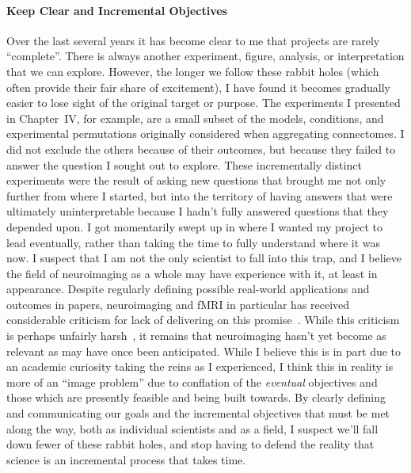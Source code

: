 \paragraph*{Keep Clear and Incremental Objectives}
Over the last several years it has become clear to me that projects are rarely ``complete''. There is always
another experiment, figure, analysis, or interpretation that we can explore. However, the longer we follow these
rabbit holes (which often provide their fair share of excitement), I have found it becomes gradually easier to lose
sight of the original target or purpose. The experiments I presented in Chapter~IV, for example, are a small
subset of the models, conditions, and experimental permutations originally considered when aggregating connectomes.
I did not exclude the others because of their outcomes, but because they failed to answer the question I sought out
to explore. These incrementally distinct experiments were the result of asking new questions that brought me not
only further from where I started, but into the territory of having answers that were ultimately uninterpretable
because I hadn't fully answered questions that they depended upon. I got momentarily swept up in where I wanted my
project to lead eventually, rather than taking the time to fully understand where it was now. I suspect that I am
not the only scientist to fall into this trap, and I believe the field of neuroimaging as a whole may have
experience with it, at least in appearance. Despite regularly defining possible real-world applications and outcomes
in papers, neuroimaging and fMRI in particular has received considerable criticism for lack of delivering on this
promise~\cite{robinson2004fmri}. While this criticism is perhaps unfairly harsh~\cite{lyon2017dead}, it remains that
neuroimaging hasn't yet become as relevant as may have once been anticipated. While I believe this is in part due to
an academic curiosity taking the reins as I experienced, I think this in reality is more of an ``image problem'' due
to conflation of the \textit{eventual} objectives and those which are presently feasible and being built towards. By
clearly defining and communicating our goals and the incremental objectives that must be met along the way, both as
individual scientists and as a field, I suspect we'll fall down fewer of these rabbit holes, and stop having to
defend the reality that science is an incremental process that takes time.

